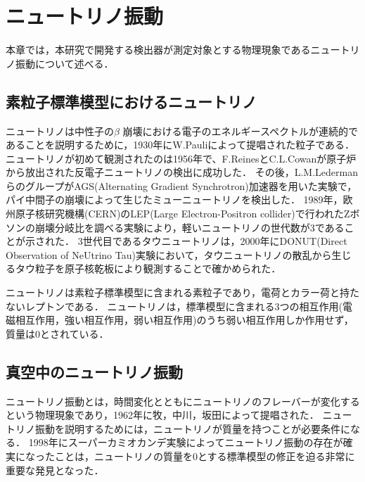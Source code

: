 \documentclass[../../main.tex]{subfiles}
\begin{document}
\chapter{ニュートリノ振動}

本章では，本研究で開発する検出器が測定対象とする物理現象であるニュートリノ振動について述べる．

\section{素粒子標準模型におけるニュートリノ}

ニュートリノは中性子の$\beta$ 崩壊における電子のエネルギースペクトルが連続的であることを説明するために，1930年にW.Pauliによって提唱された粒子である\cite{intro:nupauli}．
ニュートリノが初めて観測されたのは1956年で、F.ReinesとC.L.Cowanが原子炉から放出された反電子ニュートリノの検出に成功した\cite{intro:reinescowan}．
その後，L.M.LedermanらのグループがAGS(Alternating Gradient Synchrotron)加速器を用いた実験で，パイ中間子の崩壊によって生じたミューニュートリノを検出した\cite{intro:reinescowan}．
1989年，欧州原子核研究機構(CERN)のLEP(Large Electron-Positron collider)で行われたZボソンの崩壊分岐比を調べる実験により，軽いニュートリノの世代数が3であることが示された\cite{intro:nu3gen}．
3世代目であるタウニュートリノは，2000年にDONUT(Direct Observation of NeUtrino Tau)実験において，タウニュートリノの散乱から生じるタウ粒子を原子核乾板により観測することで確かめられた\cite{intro:taunu}．

ニュートリノは素粒子標準模型に含まれる素粒子であり，電荷とカラー荷と持たないレプトンである．
ニュートリノは，標準模型に含まれる3つの相互作用(電磁相互作用，強い相互作用，弱い相互作用)のうち弱い相互作用しか作用せず，質量は0とされている．

\section{真空中のニュートリノ振動}
\label{intro:vacosci}
ニュートリノ振動とは，時間変化とともにニュートリノのフレーバーが変化するという物理現象であり，1962年に牧，中川，坂田によって提唱された\cite{intro:mns}．
ニュートリノ振動を説明するためには，ニュートリノが質量を持つことが必要条件になる．
1998年にスーパーカミオカンデ実験によってニュートリノ振動の存在が確実になった\cite{intro:SKneuosi}ことは，ニュートリノの質量を0とする標準模型の修正を迫る非常に重要な発見となった．
\end{document}
